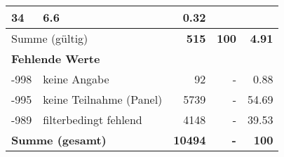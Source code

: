 \begin{longtable}{lXrrr}
       \num{34} &
       \num[round-mode=places,round-precision=2]{6,6} &
         \num[round-mode=places,round-precision=2]{0,32} \\
     \midrule
     \multicolumn{2}{l}{Summe (gültig)} &
       \textbf{\num{515}} &
     \textbf{100} &
       \textbf{\num[round-mode=places,round-precision=2]{4,91}} \\
     \multicolumn{5}{l}{\textbf{Fehlende Werte}}\\
       -998 &
       keine Angabe &
         \num{92} &
        - &
         \num[round-mode=places,round-precision=2]{0,88} \\
       -995 &
       keine Teilnahme (Panel) &
         \num{5739} &
        - &
         \num[round-mode=places,round-precision=2]{54,69} \\
       -989 &
       filterbedingt fehlend &
         \num{4148} &
        - &
         \num[round-mode=places,round-precision=2]{39,53} \\
     \midrule
     \multicolumn{2}{l}{\textbf{Summe (gesamt)}} &
          \textbf{\num{10494}} &
        \textbf{-} &
        \textbf{100} \\
     \bottomrule
     \end{longtable}
     
